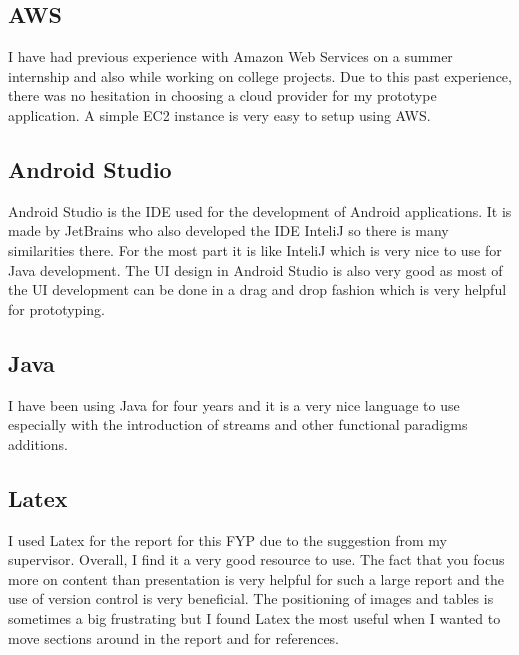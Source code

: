 \tocless\subsection{AWS}
I have had previous experience with Amazon Web Services on a summer internship and also while working on college projects.
Due to this past experience, there was no hesitation in choosing a cloud provider for my prototype application.
A simple EC2 instance is very easy to setup using AWS.

\tocless\subsection{Android Studio}
Android Studio is the IDE used for the development of Android applications.
It is made by JetBrains who also developed the IDE InteliJ so there is many similarities there.
For the most part it is like InteliJ which is very nice to use for Java development.
The UI design in Android Studio is also very good as most of the UI development can be done in a drag and drop fashion which is very helpful for prototyping.

\tocless\subsection{Java}
I have been using Java for four years and it is a very nice language to use especially with the introduction of streams and other functional paradigms additions.

\tocless\subsection{Latex}
I used Latex for the report for this FYP due to the suggestion from my supervisor.
Overall, I find it a very good resource to use.
The fact that you focus more on content than presentation is very helpful for such a large report and the use of version control is very beneficial.
The positioning of images and tables is sometimes a big frustrating but I found Latex the most useful when I wanted to move sections around in the report and for references.
